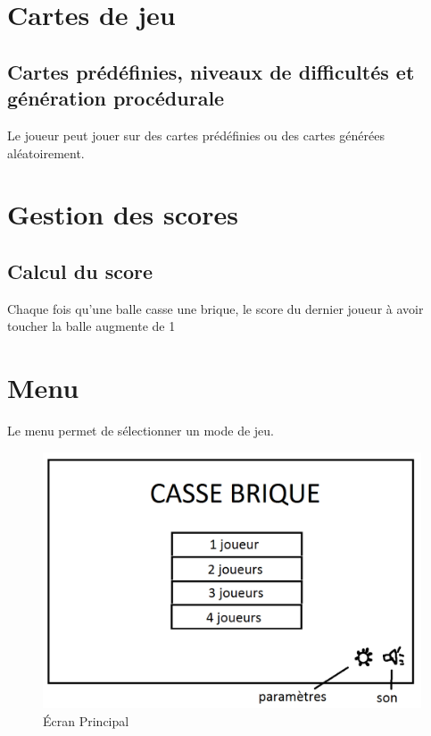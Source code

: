 \documentclass[12pt]{article}
\begin{document}
\section{Cartes de jeu}
		
	\subsection{Cartes prédéfinies, niveaux de difficultés et génération procédurale}
	
	Le joueur peut jouer sur des cartes prédéfinies ou des cartes générées aléatoirement.\\
	

\section{Gestion des scores}

	\subsection{Calcul du score}
	Chaque fois qu'une balle casse une brique, le score du dernier joueur à avoir toucher la balle augmente de 1\\
	
	\newpage

\section{Menu}

	Le menu permet de sélectionner un mode de jeu.\\

	\begin{figure}[!h]
  			\caption{\label{étiquette} Écran Principal}
  			\centerline{\includegraphics[scale=0.5]{menu}}
	\end{figure}
	
\end{document}
